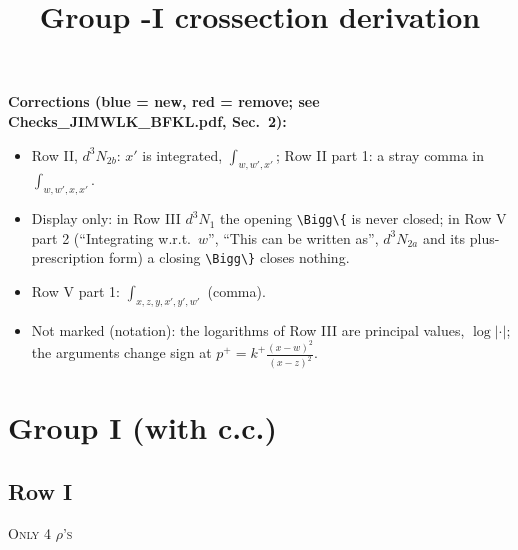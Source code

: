 \documentclass[9pt]{article}
\title{Group -I crossection derivation}
\author{}
\date{}
\numberwithin{equation}{section}
\begin{document}
\maketitle
{\color{blue}\noindent\textbf{Corrections (blue = new, red = remove; see Checks\_JIMWLK\_BFKL.pdf, Sec.~2):}
\begin{itemize}
\item Row II, $d^3N_{2b}$: $x'$ is integrated, $\int_{w,w',x'}$; Row II part 1: a stray comma in $\int_{w,w',x,x'}$.
\item Display only: in Row III $d^3N_1$ the opening \texttt{\textbackslash Bigg\textbackslash\{} is never closed; in Row V part 2 (``Integrating w.r.t.\ $w$'', ``This can be written as'', $d^3N_{2a}$ and its plus-prescription form) a closing \texttt{\textbackslash Bigg\textbackslash\}} closes nothing.
\item Row V part 1: $\int_{x,z,y,x',y',w'}$ (comma).
\item Not marked (notation): the logarithms of Row III are principal values, $\log|\cdot|$; the arguments change sign at $p^+=k^+\frac{(x-w)^2}{(x-z)^2}$.
\end{itemize}}

\section{Group I (with c.c.)}
\subsection{Row I\,}
\textsc{Only 4 $\rho$'s}
\end{document}
